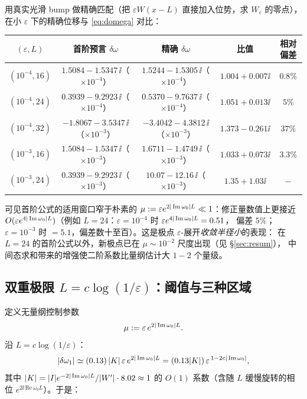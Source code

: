 用真实光滑 bump 做精确匹配（把 $\varepsilon W(x-L)$ 直接加入位势，求 $W_\varepsilon$ 的零点），
在小 $\varepsilon$ 下的精确位移与 \eqref{eq:domega} 对比：
\begin{center}\small
\begin{tabular}{ccccc}
\toprule
$(\varepsilon,L)$ & {首阶预言 $\delta\omega$}& {精确 $\delta\omega$}& {比值}& {相对偏差}\\
\midrule
$(10^{-4},16)$ & {$1.5084-1.5347\,\ii$（$\times10^{-4}$）}& {$1.5244-1.5305\,\ii$（$\times10^{-4}$）}& $1.004+0.007\ii$ & $0.8\%$\\
$(10^{-4},24)$ & {$0.3939-9.2923\,\ii$（$\times10^{-4}$）}& {$0.5370-9.7637\,\ii$（$\times10^{-4}$）}& $1.051+0.013\ii$ & $5\%$\\
$(10^{-4},32)$ & {$-1.8067-3.5347\,\ii$（$\times10^{-3}$）}& {$-3.4042-4.3812\,\ii$（$\times10^{-3}$）}& $1.373-0.261\ii$ & $37\%$\\
$(10^{-3},16)$ & {$1.5084-1.5347\,\ii$（$\times10^{-3}$）}& {$1.6711-1.4749\,\ii$（$\times10^{-3}$）}& $1.033+0.073\ii$ & $3.3\%$\\
$(10^{-3},24)$ & {$0.3939-9.2923\,\ii$（$\times10^{-3}$）}& {$10.07-12.16\,\ii$（$\times10^{-3}$）}& $1.35+1.03\ii$ & $-\!\!$\\
\bottomrule
\end{tabular}
\end{center}
可见首阶公式的适用窗口窄于朴素的 $\mu:=\varepsilon e^{2|\operatorname{Im}\omega_0|L}\ll1$：修正量数值上更接近
$O(\varepsilon e^{4|\operatorname{Im}\omega_0|L})$（例如 $L=24$：$\varepsilon=10^{-4}$ 时 $\varepsilon e^{4|\operatorname{Im}\omega_0|L}=0.51$，
偏差 $5\%$；$\varepsilon=10^{-3}$ 时 $=5.1$，偏差数十至百）。这是极点 $\varepsilon$-展开\emph{收敛半径小}的表现：
在 $L=24$ 的首阶公式以外，新极点已在 $\mu\sim10^{-2}$ 尺度出现（见 \S\ref{sec:resum}），
中间态求和带来的增强使二阶系数比量纲估计大 $1\!-\!2$ 个量级。

\subsection{双重极限 $L=c\log(1/\varepsilon)$：阈值与三种区域}
\label{sec:double}

定义无量纲控制参数
\begin{equation}
\mu:=\varepsilon\,e^{2|\operatorname{Im}\omega_0|L}.
\end{equation}
沿 $L=c\log(1/\varepsilon)$：
\begin{equation}
|\delta\omega_1|\simeq (0.13)\,|K|\,\varepsilon\,e^{2|\operatorname{Im}\omega_0|L}
=(0.13|K|)\,\varepsilon^{\,1-2c|\operatorname{Im}\omega_0|},
\end{equation}
其中 $|K|=|I|e^{-2|\operatorname{Im}\omega_0|L}/|W'|\cdot 8.02\approx1$ 的 $O(1)$ 系数（含随 $L$ 缓慢旋转的相位
$e^{2\ii\,\mathrm{Re}\,\omega_0L}$）。于是：

